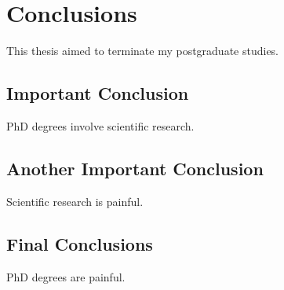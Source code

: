 \chapter{Conclusions}
\label{chapter:conclusions}

This thesis aimed to terminate my postgraduate studies. 

\section{Important Conclusion}
PhD degrees involve scientific research.

\section{Another Important Conclusion}
Scientific research is painful.

\section{Final Conclusions}
PhD degrees are painful.